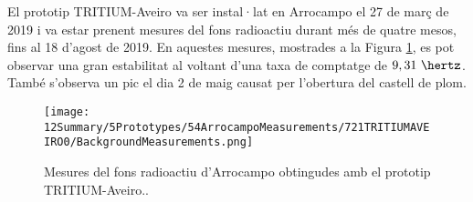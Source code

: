 El prototip TRITIUM-Aveiro va ser instal·lat en Arrocampo el 27 de març de 2019 i va estar prenent mesures del fons radioactiu durant més de quatre mesos, fins al 18 d'agost de 2019. En aquestes mesures, mostrades a la Figura \ref{fig:FonsArrocampoAveiro}, es pot observar una gran estabilitat al voltant d'una taxa de comptatge de $9,31~\hertz$. També s'observa un pic el dia 2 de maig causat per l'obertura del castell de plom.

\begin{figure}[h]
\centering
\texttt{[image: 12Summary/5Prototypes/54ArrocampoMeasurements/721TRITIUMAVEIRO0/BackgroundMeasurements.png]}
\caption{Mesures del fons radioactiu d'Arrocampo obtingudes amb el prototip TRITIUM-Aveiro.\cite{ExperimentalPaperCarlos}.\label{fig:FonsArrocampoAveiro}}
\end{figure}